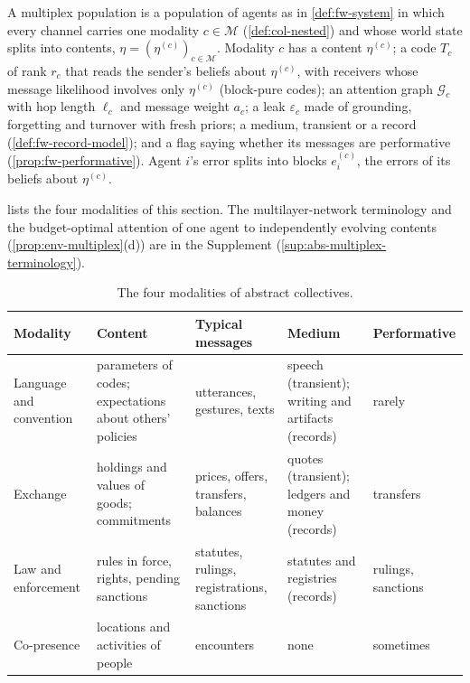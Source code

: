 \begin{definition}\label{def:abs-multiplex}
A multiplex population is a population of agents as in \cref{def:fw-system} in which every channel carries one modality $c\in\mathcal M$ (\cref{def:col-nested}) and whose world state splits into contents, $\eta=(\eta^{(c)})_{c\in\mathcal M}$. Modality $c$ has a content $\eta^{(c)}$; a code $T_c$ of rank $r_c$ that reads the sender's beliefs about $\eta^{(c)}$, with receivers whose message likelihood involves only $\eta^{(c)}$ (block-pure codes); an attention graph $\mathcal G_c$ with hop length $\ell_c$ and message weight $a_c$; a leak $\varepsilon_c$ made of grounding, forgetting and turnover with fresh priors; a medium, transient or a record (\cref{def:fw-record-model}); and a flag saying whether its messages are performative (\cref{prop:fw-performative}). Agent $i$'s error splits into blocks $e^{(c)}_i$, the errors of its beliefs about $\eta^{(c)}$.
\end{definition}

 lists the four modalities of this section. The multilayer-network terminology and the budget-optimal attention of one agent to independently evolving contents (\cref{prop:env-multiplex}(d)) are in the Supplement (\cref{sup:abs-multiplex-terminology}).

\begin{table}[t]
\centering\small
\caption{The four modalities of abstract collectives.}
\label{tab:abs-modalities}
\begin{tabular}{@{}>{\raggedright\arraybackslash}p{}>{\raggedright\arraybackslash}p{}>{\raggedright\arraybackslash}p{}>{\raggedright\arraybackslash}p{}>{\raggedright\arraybackslash}p{}@{}}
\toprule
Modality & Content & Typical messages & Medium & Performative\\
\midrule
Language and convention & parameters of codes; expectations about others' policies & utterances, gestures, texts & speech (transient); writing and artifacts (records) & rarely\\
Exchange & holdings and values of goods; commitments & prices, offers, transfers, balances & quotes (transient); ledgers and money (records) & transfers\\
Law and enforcement & rules in force, rights, pending sanctions & statutes, rulings, registrations, sanctions & statutes and registries (records) & rulings, sanctions\\
Co-presence & locations and activities of people & encounters & none & sometimes\\
\bottomrule
\end{tabular}
\end{table}


